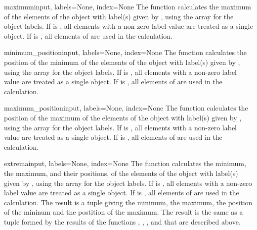 \begin{funcdesc}{maximum}{input, labels=None, index=None}
  The  function calculates the maximum of the elements of 
  the object with label(s) given by , using the  
  array for the object labels. If  is , all 
  elements with a non-zero label value are treated as a single object. If 
   is , all elements of  are used in 
  the calculation.
\end{funcdesc}

\begin{funcdesc}{minimum_position}{input, labels=None, index=None}
  The  function calculates the position of the
  minimum of the elements of the object with label(s) given by ,
  using the  array for the object labels. If  is
  , all elements with a non-zero label value are treated as 
  a single object. If  is , all elements of 
   are used in the calculation.
\end{funcdesc}

\begin{funcdesc}{maximum_position}{input, labels=None, index=None}
  The  function calculates the position of the
  maximum of the elements of the object with label(s) given by ,
  using the  array for the object labels. If  is
  , all elements with a non-zero label value are treated as 
  a single object. If  is , all elements of 
   are used in the calculation.
\end{funcdesc}

\begin{funcdesc}{extrema}{input, labels=None, index=None}
  The  function calculates the minimum, the maximum, and 
  their positions, of the elements of the object with label(s) given by 
  , using the  array for the object labels. If 
   is , all elements with a non-zero label value 
  are treated as a single object. If  is , all 
  elements of  are used in the calculation. The result is a 
  tuple giving the minimum, the maximum, the position of the mininum and 
  the postition of the maximum. The result is the same as a tuple formed by 
  the results of the functions , , 
  , and  that are 
  described above.
\end{funcdesc}

